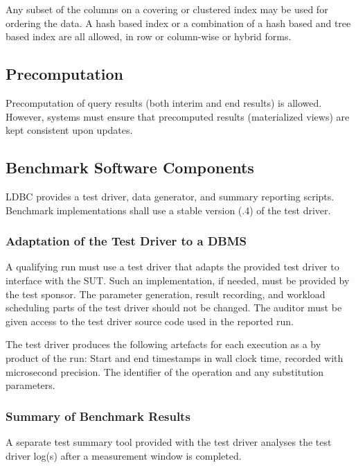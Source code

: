 Any subset of the columns on a covering or clustered index may be used for ordering the data. A hash based index or a combination of a hash based and tree based index are all allowed, in row or column-wise or hybrid forms.

\subsection{Precomputation}

Precomputation of query results (both interim and end results) is allowed. However, systems must ensure that precomputed results (\eg materialized views) are kept consistent upon updates.

\subsection{Benchmark Software Components}
\label{sec:snb-software-components}
LDBC provides a test driver, data generator, and summary reporting scripts. Benchmark implementations shall use a stable version (.4) of the test driver.

\subsubsection{Adaptation of the Test Driver to a DBMS}
\label{sec:test-driver}
A qualifying run must use a test driver that adapts the provided test driver to interface with the SUT. Such an implementation, if needed, must be provided by the test sponsor. The parameter generation, result recording, and workload scheduling parts of the test driver should not be changed. The auditor must be given access to the test driver source code used in the reported run.

The test driver produces the following artefacts for each execution as a by product of the run: Start and end timestamps in wall clock time, recorded with microsecond precision. The identifier of the operation and any substitution parameters.


\subsubsection{Summary of Benchmark Results}
\label{sec:performance-metrics}
A separate test summary tool provided with the test driver analyses the test driver log(s) after a measurement window is completed. 

